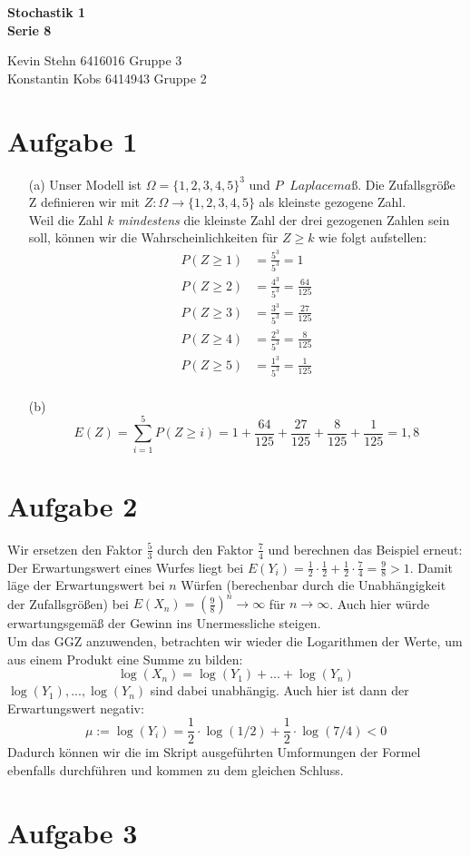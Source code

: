 \documentclass[10pt,a4paper]{article}
\newcommand{\ent}{\mathop{\widehat{=}}}
\begin{document}
\begin{center}
\textbf{Stochastik 1 \\ Serie 8 \\}
\end{center}

\begin{flushright}
Kevin Stehn 6416016 Gruppe 3 \\
Konstantin Kobs 6414943 Gruppe 2
\end{flushright}

\section*{Aufgabe 1}
\begin{itemize}
\item[(a)] Unser Modell ist $\Omega = \{1,2,3,4,5\}^3$ und $P \ent Laplacemaß$. Die Zufallsgröße Z definieren wir mit $Z: \Omega \rightarrow \{1,2,3,4,5\}$ als kleinste gezogene Zahl.\\
Weil die Zahl $k$ \textit{mindestens} die kleinste Zahl der drei gezogenen Zahlen sein soll, können wir die Wahrscheinlichkeiten für $Z \geq k$ wie folgt aufstellen:
\begin{align*}
P(Z \geq 1) &= \frac{5^3}{5^3} = 1\\
P(Z \geq 2) &= \frac{4^3}{5^3} = \frac{64}{125}\\
P(Z \geq 3) &= \frac{3^3}{5^3} = \frac{27}{125}\\
P(Z \geq 4) &= \frac{2^3}{5^3} = \frac{8}{125}\\
P(Z \geq 5) &= \frac{1^3}{5^3} = \frac{1}{125}\\
\end{align*}

\item[(b)] 
$$E(Z) = \sum_{i=1}^5 P(Z \geq i) = 1 + \frac{64}{125} + \frac{27}{125}+ \frac{8}{125} + \frac{1}{125} = 1,8$$
\end{itemize}

\section*{Aufgabe 2}
Wir ersetzen den Faktor $\frac{5}{3}$ durch den Faktor $\frac{7}{4}$ und berechnen das Beispiel erneut:\\
Der Erwartungswert eines Wurfes liegt bei $E(Y_i)=\frac{1}{2} \cdot \frac{1}{2} + \frac{1}{2} \cdot \frac{7}{4} = \frac{9}{8} > 1$. Damit läge der Erwartungswert bei $n$ Würfen (berechenbar durch die Unabhängigkeit der Zufallsgrößen) bei $E(X_n)=\left(\frac{9}{8}\right)^n \rightarrow \infty$ für $n \rightarrow \infty$. Auch hier würde erwartungsgemäß der Gewinn ins Unermessliche steigen.\\
Um das GGZ anzuwenden, betrachten wir wieder die Logarithmen der Werte, um aus einem Produkt eine Summe zu bilden:
$$\log(X_n)=\log(Y_1)+...+\log(Y_n)$$
$\log(Y_1), ..., \log(Y_n)$ sind dabei unabhängig. Auch hier ist dann der Erwartungswert negativ:
$$\mu := \log(Y_i) = \frac{1}{2} \cdot \log(1/2) + \frac{1}{2} \cdot \log(7/4) < 0$$
Dadurch können wir die im Skript ausgeführten Umformungen der Formel ebenfalls durchführen und kommen zu dem gleichen Schluss.

\section*{Aufgabe 3}
\end{document}
